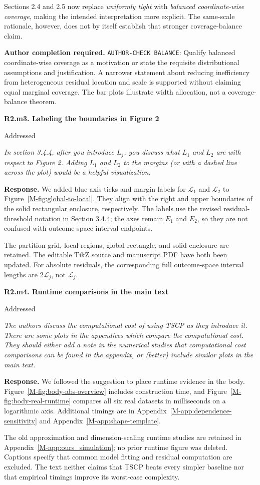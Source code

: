 \documentclass[11pt]{article}
\newcommand{\msapp}[1]{Appendix~\ref*{M-#1}}
\newcommand{\msfig}[1]{Figure~\ref*{M-#1}}
\newcommand{\action}[1]{\par{\small\color{ActionRed}\textbf{Author completion required.} #1\par}}
\newcommand{\point}[3]{\par\Needspace{7\baselineskip}\medskip
\noindent\parbox[t]{0.77\linewidth}{\textbf{#1}}\hfill
\parbox[t]{0.21\linewidth}{\raggedleft\small\sffamily #2}\par\nopagebreak
{\color{ReviewerBlue}\small\itshape #3\par}\textbf{Response.} }
\begin{document}
Sections 2.4 and 2.5 now replace \emph{uniformly tight} with \emph{balanced coordinate-wise coverage}, making the intended interpretation more explicit. The same-scale rationale, however, does not by itself establish that stronger coverage-balance claim.

\action{\texttt{AUTHOR-CHECK BALANCE}: Qualify balanced coordinate-wise coverage as a motivation or state the requisite distributional assumptions and justification. A narrower statement about reducing inefficiency from heterogeneous residual location and scale is supported without claiming equal marginal coverage. The bar plots illustrate width allocation, not a coverage-balance theorem.}

\point{R2.m3. Labeling the boundaries in Figure 2}{Addressed}{In section 3.4.4, after you introduce $L_j$, you discuss what
$L_1$ and $L_2$ are with respect to Figure 2. Adding $L_1$ and
$L_2$ to the margins (or with a dashed line across the plot)
would be a helpful visualization.}
\label{response:R2.m3}
We added blue axis ticks and margin labels for $\mathcal L_1$ and $\mathcal L_2$ to \msfig{fig:global-to-local}. They align with the right and upper boundaries of the solid rectangular enclosure, respectively. The labels use the revised residual-threshold notation in Section 3.4.4; the axes remain $E_1$ and $E_2$, so they are not confused with outcome-space interval endpoints.

The partition grid, local regions, global rectangle, and solid enclosure are retained. The editable TikZ source and manuscript PDF have both been updated. For absolute residuals, the corresponding full outcome-space interval lengths are $2\mathcal L_j$, not $\mathcal L_j$.

\point{R2.m4. Runtime comparisons in the main text}{Addressed}{The authors discuss the computational cost of using TSCP as they
introduce it. There are some plots in the appendices which compare
the computational cost. They should either add a note in the
numerical studies that computational cost comparisons can be
found in the appendix, or (better) include similar plots in the
main text.}
\label{response:R2.m4}
We followed the suggestion to place runtime evidence in the body. \msfig{fig:body-abs-overview} includes construction time, and \msfig{fig:body-real-runtime} compares all six real datasets in milliseconds on a logarithmic axis. Additional timings are in \msapp{app:dependence-sensitivity} and \msapp{app:shape-template}.

The old approximation and dimension-scaling runtime studies are retained in \msapp{app:ours_simulation}; no prior runtime figure was deleted. Captions specify that common model fitting and residual computation are excluded. The text neither claims that TSCP beats every simpler baseline nor that empirical timings improve its worst-case complexity.
\end{document}
